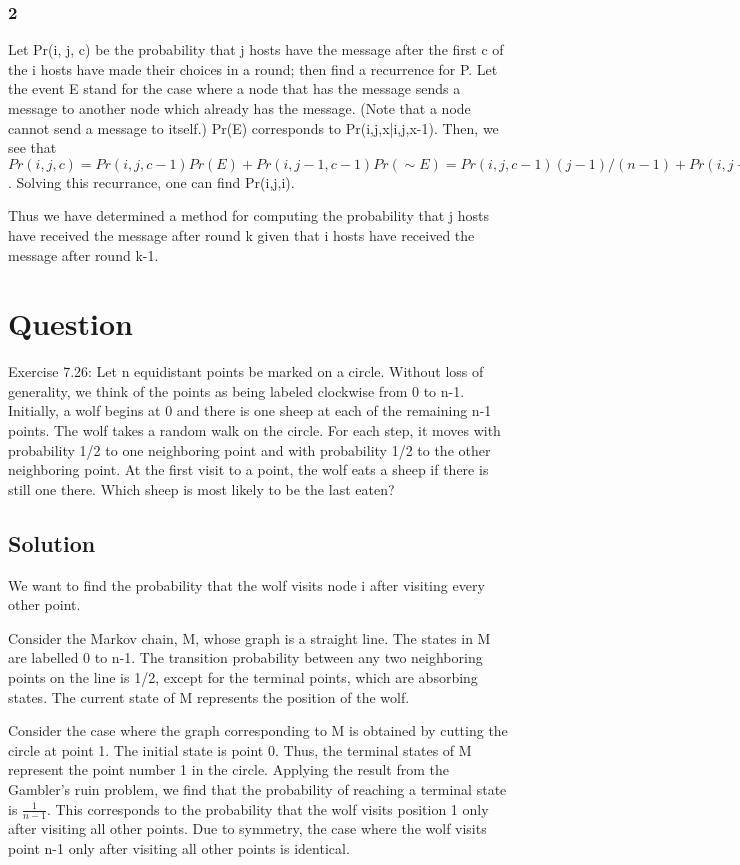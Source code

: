 \documentclass[10pt]{amsart}
\theoremstyle{remark}
\begin{document}
\subsubsection{2} Let Pr(i, j, c) be the probability that j hosts have the message after the first c of the i hosts have made their choices in a round; then find a recurrence for P. Let the event E stand for the case where a node that has the message sends a message to another node which already has the message. (Note that a node cannot send a message to itself.) Pr(E) corresponds to Pr(i,j,x|i,j,x-1). Then, we see that $Pr(i, j, c) = Pr(i, j, c-1) Pr(E) + Pr(i, j-1, c-1)Pr(\sim E) = Pr(i, j, c-1) (j-1)/(n-1) + Pr(i, j-1, c-1)(n-j+1)/(n-1)$. Solving this recurrance, one can find Pr(i,j,i).

Thus we have determined a method for computing the probability that j hosts have received the message after round k given that i hosts have received the message after round k-1.

\section{Question}
Exercise 7.26: Let n equidistant points be marked on a circle. Without loss of generality, we think of the points as being labeled clockwise from 0 to n-1. Initially, a wolf begins at 0 and there is one sheep at each of the remaining n-1 points. The wolf takes a random walk on the circle. For each step, it moves with probability 1/2 to one neighboring point and with probability 1/2 to the other neighboring point. At the first visit to a point, the wolf eats a sheep if there is still one there. Which sheep is most likely to be the last eaten?

\subsection{Solution}

We want to find the probability that the wolf visits node i after visiting every other point.

Consider the Markov chain, M, whose graph is a straight line. The states in M are labelled 0 to n-1. The transition probability between any two neighboring points on the line is 1/2, except for the terminal points, which are absorbing states. The current state of M represents the position of the wolf.

Consider the case where the graph corresponding to M is obtained by cutting the circle at point 1. The initial state is point 0. Thus, the terminal states of M represent the point number 1 in the circle. Applying the result from the Gambler's ruin problem, we find that the probability of reaching a terminal state is $\frac{1}{n-1}$. This corresponds to the probability that the wolf visits position 1 only after visiting all other points. Due to symmetry, the case where the wolf visits point n-1 only after visiting all other points is identical.
\end{document}
